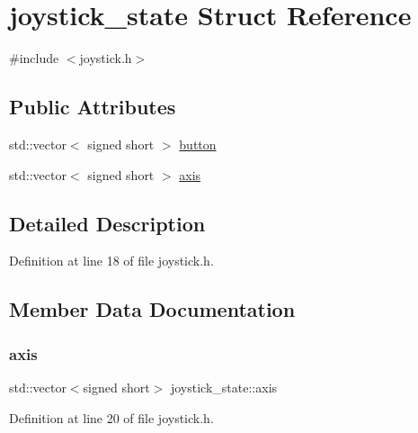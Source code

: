 \hypertarget{structjoystick__state}{}\section{joystick\+\_\+state Struct Reference}
\label{structjoystick__state}


{\ttfamily \#include $<$joystick.\+h$>$}

\subsection*{Public Attributes}
\begin{DoxyCompactItemize}
\item 
std\+::vector$<$ signed short $>$ \hyperlink{structjoystick__state_af16d0e2bea842ab4fafa05ce23f45f56}{button}
\item 
std\+::vector$<$ signed short $>$ \hyperlink{structjoystick__state_acc10718083ec5603bfcca9d1780239f2}{axis}
\end{DoxyCompactItemize}


\subsection{Detailed Description}


Definition at line 18 of file joystick.\+h.



\subsection{Member Data Documentation}
\mbox{\label{structjoystick__state_acc10718083ec5603bfcca9d1780239f2}} 
\subsubsection{\texorpdfstring{axis}{axis}}
{\footnotesize\ttfamily std\+::vector$<$signed short$>$ joystick\+\_\+state\+::axis}



Definition at line 20 of file joystick.\+h.

\mbox{\label{structjoystick__state_af16d0e2bea842ab4fafa05ce23f45f56}} 
